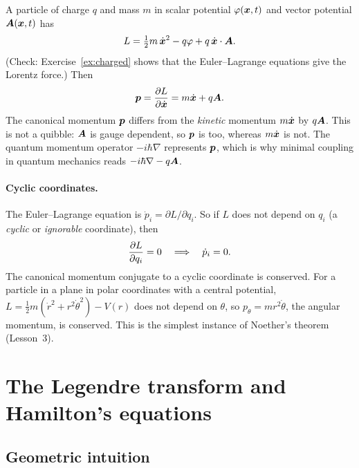 \documentclass[11pt]{article}
\begin{document}
\begin{example}
A particle of charge $q$ and mass $m$ in scalar potential $\varphi(\bm{x},t)$ and vector potential $\bm{A}(\bm{x},t)$ has
\begin{equation}
 L=\tfrac12 m\,\dot{\bm{x}}^2 - q\varphi + q\,\dot{\bm{x}}\cdot\bm{A} .
\label{eq:Lcharged}
\end{equation}
(Check: Exercise~\ref{ex:charged} shows that the Euler--Lagrange equations give the Lorentz force.) Then
\begin{equation}
 \bm{p}=\frac{\partial L}{\partial \dot{\bm{x}}} = m\dot{\bm{x}}+q\bm{A} .
\end{equation}
The canonical momentum $\bm{p}$ differs from the \emph{kinetic} momentum $m\dot{\bm{x}}$ by $q\bm{A}$. This is not a quibble: $\bm{A}$ is gauge dependent, so $\bm{p}$ is too, whereas $m\dot{\bm{x}}$ is not. The quantum momentum operator $-i\hbar\nabla$ represents $\bm{p}$, which is why minimal coupling in quantum mechanics reads $-i\hbar\nabla - q\bm{A}$.
\end{example}

\paragraph{Cyclic coordinates.} The Euler--Lagrange equation is $\dot p_i=\partial L/\partial q_i$. So if $L$ does not depend on $q_i$ (a \emph{cyclic} or \emph{ignorable} coordinate), then
\begin{equation}
 \frac{\partial L}{\partial q_i}=0 \quad\Longrightarrow\quad \dot p_i=0 .
\end{equation}
The canonical momentum conjugate to a cyclic coordinate is conserved. For a particle in a plane in polar coordinates with a central potential, $L=\tfrac12m(\dot r^2+r^2\dot\theta^2)-V(r)$ does not depend on $\theta$, so $p_\theta=mr^2\dot\theta$, the angular momentum, is conserved. This is the simplest instance of Noether's theorem (Lesson~3).

\section{The Legendre transform and Hamilton's equations}

\subsection{Geometric intuition}
\end{document}
